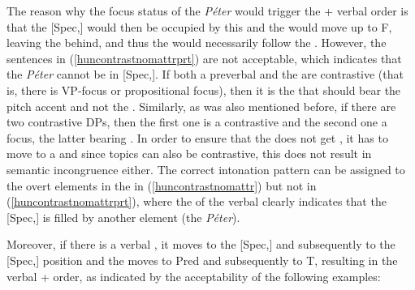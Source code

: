 \ea \label{huncontrastnomattrprt}
\z
\z

The reason why the focus status of the  \textit{Péter} would trigger the  + verbal  order is that the [Spec,] would then be occupied by this  and the  would move up to F, leaving the  behind, and thus the  would necessarily follow the . However, the sentences in (\ref{huncontrastnomattrprt}) are not acceptable, which indicates that the  \textit{Péter} cannot be in [Spec,]. If both a preverbal  and the  are contrastive (that is, there is VP-focus or propositional focus), then it is the  that should bear the pitch accent and not the . Similarly, as was also mentioned before, if there are two contrastive DPs, then the first one is a contrastive  and the second one a focus, the latter bearing . In order to ensure that the  does not get , it has to move to a  and since topics can also be contrastive, this does not result in semantic incongruence either. The correct intonation pattern can be assigned to the overt elements in the  in (\ref{huncontrastnomattr}) but not in (\ref{huncontrastnomattrprt}), where the  of the verbal  clearly indicates that the [Spec,] is filled by another element (the  \textit{Péter}).

Moreover, if there is a verbal , it moves to the [Spec,] and subsequently to the [Spec,] position and the  moves to Pred and subsequently to T, resulting in the verbal  +  order, as indicated by the acceptability of the following examples:

\ea \label{huncontrastnomattrprtgrammatical}
\z
\z

